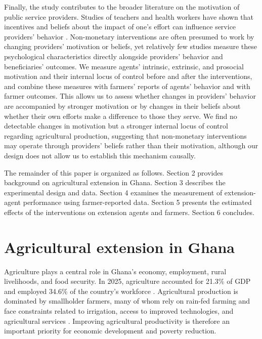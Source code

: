 \documentclass[11pt]{article}
\begin{document}
Finally, the study contributes to the broader literature on the motivation of public service providers. Studies of teachers and health workers have shown that incentives and beliefs about the impact of one's effort can influence service providers' behavior \citep{Duflo2012, Ashraf2014, Banuri2016, Mansuri2023, Kaur2023, Khan2025}. Non-monetary interventions are often presumed to work by changing providers' motivation or beliefs, yet relatively few studies measure these psychological characteristics directly alongside providers' behavior and beneficiaries' outcomes. We measure agents' intrinsic, extrinsic, and prosocial motivation and their internal locus of control before and after the interventions, and combine these measures with farmers' reports of agents' behavior and with farmer outcomes. This allows us to assess whether changes in providers’ behavior are accompanied by stronger motivation or by changes in their beliefs about whether their own efforts make a difference to those they serve. We find no detectable changes in motivation but a stronger internal locus of control regarding agricultural production, suggesting that non-monetary interventions may operate through providers’ beliefs rather than their motivation, although our design does not allow us to establish this mechanism causally.

The remainder of this paper is organized as follows. Section 2 provides background on agricultural extension in Ghana. Section 3 describes the experimental design and data. Section 4 examines the measurement of extension-agent performance using farmer-reported data. Section 5 presents the estimated effects of the interventions on extension agents and farmers. Section 6 concludes.

\section{Agricultural extension in Ghana}\label{sec:context}

Agriculture plays a central role in Ghana's economy, employment, rural livelihoods, and food security. In 2025, agriculture accounted for 21.3\% of GDP and employed 34.6\% of the country's workforce \citep{worldbank_wdi_2026}. Agricultural production is dominated by smallholder farmers, many of whom rely on rain-fed farming and face constraints related to irrigation, access to improved technologies, and agricultural services \citet{gipc_agriculture_2025}. Improving agricultural productivity is therefore an important priority for economic development and poverty reduction.
\end{document}
